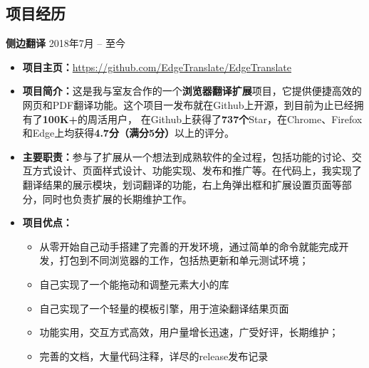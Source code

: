 \documentclass[10pt]{article} %
\begin{document}
\begin{paracol}{2}

\section{项目经历}


{\large{\textbf{侧边翻译}}} \hfill \textsc{2018年7月 -- 至今} %
	\begin{itemize}
		\item \textbf{项目主页：}\href{https://github.com/EdgeTranslate/EdgeTranslate}{\small{https://github.com/EdgeTranslate/EdgeTranslate}} %
		\item \textbf{项目简介：}{这是我与室友合作的一个\textbf{浏览器翻译扩展}项目，它提供便捷高效的网页和PDF翻译功能。这个项目一发布就在Github上开源，到目前为止已经拥有了\textbf{100K+}的周活用户，
		在Github上获得了\textbf{737个}Star，在Chrome、Firefox和Edge上均获得\textbf{4.7分（满分5分）}以上的评分。} %
		\item \textbf{主要职责：}{参与了扩展从一个想法到成熟软件的全过程，包括功能的讨论、交互方式设计、页面样式设计、功能实现、发布和推广等。在代码上，我实现了翻译结果的展示模块，划词翻译的功能，右上角弹出框和扩展设置页面等部分，同时也负责扩展的长期维护工作。} %
		\item \textbf{项目优点：}{
			\begin{itemize}			
			\item 从零开始自己动手搭建了完善的开发环境，通过简单的命令就能完成开发，打包到不同浏览器的工作，包括热更新和单元测试环境；
			\item 自己实现了一个能拖动和调整元素大小的库
			\item 自己实现了一个轻量的模板引擎，用于渲染翻译结果页面			
			\item 功能实用，交互方式高效，用户量增长迅速，广受好评，长期维护；
			\item 完善的文档，大量代码注释，详尽的release发布记录
		\end{itemize}} %
	\end{itemize}



\end{paracol}
\end{document}
